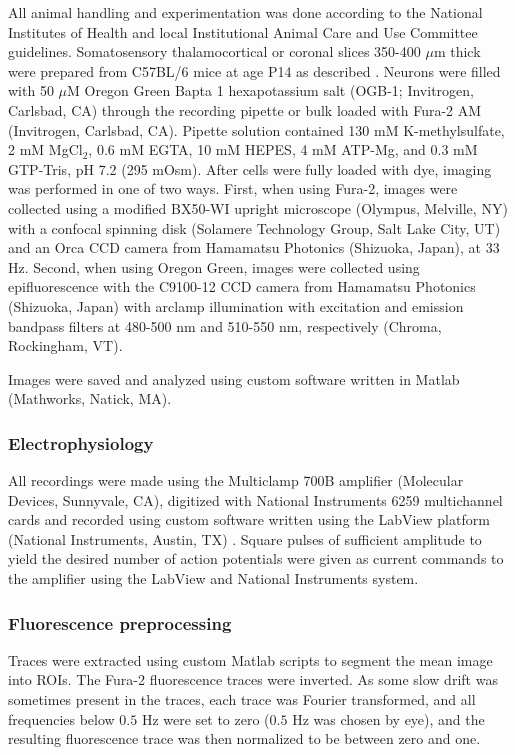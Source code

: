 All animal handling and experimentation was done according to the National Institutes of Health and local Institutional Animal Care and Use Committee guidelines. Somatosensory thalamocortical or coronal slices 350-400 $\mu$m thick were prepared from C57BL/6 mice at age P14 as described \cite{MacLeanYuste05}. Neurons were filled with 50 $\mu$M Oregon Green Bapta 1 hexapotassium salt (OGB-1; Invitrogen, Carlsbad, CA) through the recording pipette or bulk loaded with Fura-2 AM (Invitrogen, Carlsbad, CA). Pipette solution contained 130 mM K-methylsulfate, 2 mM MgCl$_2$, $0.6$ mM EGTA, 10 mM HEPES, 4 mM ATP-Mg, and $0.3$ mM GTP-Tris, pH 7.2 (295 mOsm).  After cells were fully loaded with dye, imaging was performed in one of two ways.  First, when using Fura-2, images were collected using a modified BX50-WI upright microscope (Olympus, Melville, NY) with a confocal spinning disk (Solamere Technology Group, Salt Lake City, UT) and an Orca CCD camera from Hamamatsu Photonics (Shizuoka, Japan), at 33 Hz.  Second, when using Oregon Green, images were collected using epifluorescence with the C9100-12 CCD camera from Hamamatsu Photonics (Shizuoka, Japan) with arclamp illumination with excitation and emission bandpass filters at 480-500 nm and 510-550 nm, respectively  (Chroma, Rockingham, VT). 

 Images were saved and analyzed using custom software written in Matlab (Mathworks, Natick, MA).

\subsubsection{Electrophysiology}

All recordings were made using the Multiclamp 700B amplifier (Molecular Devices, Sunnyvale, CA), digitized with National Instruments 6259 multichannel cards and recorded using custom software written using the LabView platform (National Instruments, Austin, TX) .  Square pulses of sufficient amplitude to yield the desired number of action potentials were given as current commands to the amplifier using the LabView and National Instruments system.

\subsubsection{Fluorescence preprocessing}

Traces were extracted using custom Matlab scripts to segment the mean image into ROIs.  The Fura-2 fluorescence traces were inverted.  As some slow drift was sometimes present in the traces, each trace was Fourier transformed, and all frequencies below $0.5$ Hz were set to zero ($0.5$ Hz was chosen by eye), and the resulting fluorescence trace was then normalized to be between zero and one.  







